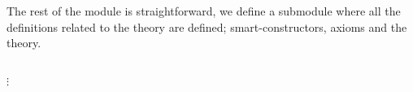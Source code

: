 \begin{code}
\>[0]%
\>[70I]%
\>[71I]\AgdaSymbol{\{}\AgdaSpace{}%
\AgdaSymbol{:}\AgdaSpace{}%
\AgdaSpace{}%
\AgdaSpace{}%
\AgdaSpace{}%
\AgdaSpace{}%
\AgdaSpace{}%
\AgdaSymbol{\}}\<%
\\
\>[.][@{}l@{}]\<[71I]%
\>[14]\AgdaSymbol{(}%
\>[22]\AgdaSymbol{:}\AgdaSpace{}%
\AgdaSpace{}%
\AgdaSymbol{(}\AgdaInductiveConstructor{[]}\AgdaSpace{}%
\AgdaOperator{\AgdaInductiveConstructor{,}}\AgdaSpace{}%
\AgdaSymbol{))}\<%
\\
%
\>[14]\AgdaSymbol{(}%
\>[21]\AgdaSymbol{:}\AgdaSpace{}%
\AgdaSpace{}%
\AgdaSymbol{((}\AgdaSpace{}%
\AgdaSpace{}%
\AgdaOperator{\AgdaFunction{[}}\AgdaSpace{}%
\AgdaSpace{}%
\AgdaOperator{\AgdaFunction{]}}\AgdaSymbol{)}\AgdaSpace{}%
\AgdaOperator{\AgdaInductiveConstructor{,}}\AgdaSpace{}%
\AgdaSymbol{))}\AgdaSpace{}%
\<%
\\%
\\[\AgdaEmptyExtraSkip]%
\>[0][@{}l@{\AgdaIndent{0}}]%
\>[2]\AgdaSpace{}%
\AgdaSymbol{:}\AgdaSpace{}%
\<%
\\%
\>[2]\AgdaSpace{}%
\AgdaSymbol{=}\AgdaSpace{}%
\AgdaSpace{}%
\AgdaSymbol{\{}\AgdaSpace{}%
\AgdaSpace{}%
\AgdaSymbol{=}\AgdaSpace{}%
\AgdaSpace{}%
\AgdaSymbol{;}\AgdaSpace{}%
\AgdaSpace{}%
\AgdaSymbol{=}\AgdaSpace{}%
\AgdaSpace{}%
\AgdaSymbol{\}}\<%
\end{code}

\noindent The rest of the module is straightforward, we define a submodule
 where all the definitions related to the theory are defined;
smart-constructors, axioms and the theory.

\begin{code}
  \>[0][@{}l@{\AgdaIndent{0}}]%
  \>[2]\AgdaSpace{}%
  \AgdaSpace{}%
  \\
  \>[2][@{}l@{\AgdaIndent{0}}]%
  \>[4]
  $\vdots$
  \\
  \>[4]\AgdaSpace{}%
  \AgdaSymbol{=}\AgdaSpace{}%
  \AgdaSpace{}%
  \AgdaSpace{}%
  \AgdaSpace{}%
  \AgdaSpace{}%
  \AgdaSpace{}%
  \AgdaSpace{}%
  \<%
\end{code}

